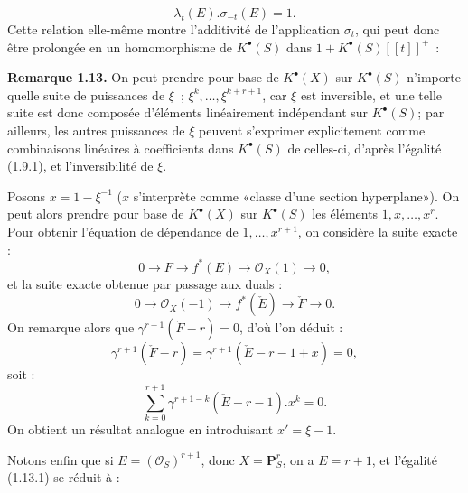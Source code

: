 \begin{equation}\tag{1.12.1}
  \lambda_t(E).\sigma_{-t}(E)=1.
\end{equation}
Cette relation elle-même montre l'additivité de l'application \(\sigma_t\), qui peut donc être prolongée en un homomorphisme de \(K^{\bullet}(S)\) dans \(1+K^{\bullet}(S)[[t]]^+\)~:

\textbf{Remarque 1.13.} On peut prendre pour base de \(K^{\bullet}(X)\) sur \(K^{\bullet}(S)\) n'importe quelle suite de puissances de \(\xi\)~; \(\xi^k,\ldots,\xi^{k+r+1}\), car \(\xi\) est inversible, et une telle suite est donc composée d'éléments linéairement indépendant sur \(K^{\bullet}(S)\); par ailleurs, les autres puissances de \(\xi\) peuvent s'exprimer explicitement comme combinaisons linéaires à coefficients dans \(K^{\bullet}(S)\) de celles-ci, d'après l'égalité (1.9.1), et l'inversibilité de \(\xi\).

Posons \(x=1-\xi^{-1}\) (\(x\) s'interprète comme «classe d'une section hyperplane»). On peut alors prendre pour base de \(K^{\bullet}(X)\) sur \(K^{\bullet}(S)\) les éléments \(1,x,\ldots,x^r\). Pour obtenir l'équation de dépendance de \(1,\ldots,x^{r+1}\), on considère la suite exacte :
\[
  0\longrightarrow F\longrightarrow f^*(E)\longrightarrow \mathcal O_X(1)\longrightarrow0,
\]
et la suite exacte obtenue par passage aux duals :
\[
  0\longrightarrow \mathcal O_X(-1)\longrightarrow f^*(\check E)\longrightarrow \check F\longrightarrow0.
\]
On remarque alors que \(\gamma^{r+1}(\check F-r)=0\), d'où l'on déduit :
\[
  \gamma^{r+1}(\check F-r)=\gamma^{r+1}(\check E-r-1+x)=0,
\]
soit :
\begin{equation}\tag{1.13.1}
  \sum_{k=0}^{r+1}\gamma^{r+1-k}(\check E-r-1).x^k=0.
\end{equation}
On obtient un résultat analogue en introduisant \(x'=\xi-1\).

Notons enfin que si \(E=(\mathcal O_S)^{r+1}\), donc \(X=\mathbf P_S^r\), on a \(E=r+1\), et l'égalité (1.13.1) se réduit à :
